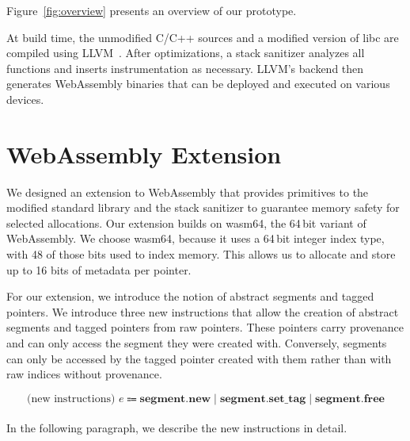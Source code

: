 Figure~\ref{fig:overview} presents an overview of our prototype.

At build time, the unmodified C/C++ sources and a modified version of libc are compiled using LLVM~\cite{lattner2004llvm}.
After optimizations, a stack sanitizer analyzes all functions and inserts instrumentation as necessary.
LLVM's backend then generates WebAssembly binaries that can be deployed and executed on various devices.

\section{WebAssembly Extension}
\label{sec:wasm-extension}

We designed an extension to WebAssembly that provides primitives to the modified standard library and the stack sanitizer to guarantee memory safety for selected allocations.
Our extension builds on wasm64, the 64\,bit variant of WebAssembly.
We choose wasm64, because it uses a 64\,bit integer index type, with 48 of those bits used to index memory.
This allows us to allocate and store up to 16 bits of metadata per pointer.

For our extension, we introduce the notion of abstract segments and tagged pointers.
We introduce three new instructions that allow the creation of abstract segments and tagged pointers from raw pointers.
These pointers carry provenance and can only access the segment they were created with.
Conversely, segments can only be accessed by the tagged pointer created with them rather than with raw indices without provenance.

\begin{equation*}
    \text{(new instructions) } e \Coloneqq \textbf{segment.new} \mid \textbf{segment.set\_tag} \mid \textbf{segment.free}
\end{equation*}

\paragraph{}
In the following paragraph, we describe the new instructions in detail.

